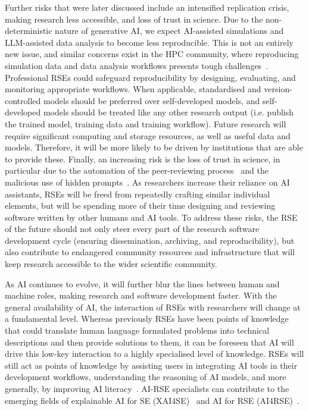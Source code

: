 \documentclass{eceasst}
\begin{document}
Further risks that were later discussed include an intensified replication crisis,
making research less accessible, and loss of trust in science.
Due to the non-deterministic nature of generative AI, we expect AI-assisted simulations
and LLM-assisted data analysis to become less reproducible.
This is not an entirely new issue, and similar concerns exist in the HPC community,
where reproducing simulation data and data analysis workflows presents tough challenges~\cite{Antunes2024}.
Professional RSEs could safeguard reproducibility by designing, evaluating, and monitoring appropriate workflows.
When applicable, standardised and version-controlled models should be preferred
over self-developed models, and self-developed models should be treated like any
other research output (i.e. publish the trained model, training data and training workflow).
Future research will require significant computing and storage resources, as well as useful data and models.
Therefore, it will be more likely to be driven by institutions that are able to provide these.
Finally, an increasing risk is the loss of trust in science,
in particular due to the automation of the peer-reviewing process~\cite{Naddaf2025}
and the malicious use of hidden prompts~\cite{Gibney2025}.
As researchers increase their reliance on AI assistants,
RSEs will be freed from repeatedly crafting similar individual elements,
but will be spending more of their time designing and reviewing software written by other humans and AI tools.
To address these risks, the RSE of the future should not only steer every part
of the research software development cycle (ensuring dissemination, archiving, and reproducibility),
but also contribute to endangered community resources and infrastructure that
will keep research accessible to the wider scientific community.

As AI continues to evolve, it will further blur the lines between human and machine roles, making research and software development faster.
With the general availability of AI, the interaction of RSEs with researchers will change at a fundamental level.
Whereas previously RSEs have been points of knowledge that could translate
human language formulated problems into technical descriptions and then provide solutions to them,
it can be foreseen that AI will drive this low-key interaction to a highly specialised level of knowledge.
RSEs will still act as points of knowledge by assisting users in integrating
AI tools in their development workflows, understanding the reasoning of AI models,
and more generally, by improving AI literacy~\cite{Alenezi2025}.
AI-RSE specialists can contribute to the emerging fields of explainable
AI for SE (XAI4SE)~\cite{Mohammadkhani2023v1} and AI for RSE (AI4RSE)~\cite{Farshidi2025v1}.
\end{document}
